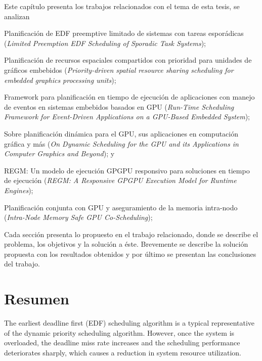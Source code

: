 Este capítulo presenta los trabajos relacionados con el tema de esta tesis, se analizan 
\begin{inparaenum}
	\item Planificación de EDF preemptive limitado de sistemas con tareas esporádicas
	 (\textit{Limited Preemption EDF Scheduling of Sporadic Task Systems});
	 \item Planificación de recursos espaciales compartidos con prioridad para unidades de gráficos embebidos 
	 (\textit{Priority-driven spatial resource sharing scheduling for embedded graphics processing units});
	\item Framework para planificación en tiempo de ejecución de aplicaciones con manejo de eventos en sistemas embebidos basados en GPU 
	(\textit{Run-Time Scheduling Framework for Event-Driven Applications on a GPU-Based Embedded System});
	\item Sobre planificación dinámica para el GPU, sus aplicaciones en computación gráfica y más
	(\textit{On Dynamic Scheduling for the GPU and its Applications in Computer Graphics and Beyond}); y
	\item REGM: Un modelo de ejecución GPGPU responsivo para soluciones en tiempo de ejecución
	(\textit{REGM: A Responsive GPGPU Execution Model for Runtime Engines});
    	\item Planificación conjunta con GPU y aseguramiento de la memoria intra-nodo 
	(\textit{Intra-Node Memory Safe GPU Co-Scheduling});
 \end{inparaenum}

\vspace{0.3cm}
Cada sección presenta lo propuesto en el trabajo relacionado, donde se describe el problema, los objetivos y la solución a éste. Brevemente se describe la solución propuesta con los resultados obtenidos y por último se presentan las conclusiones del trabajo.


\section{Resumen}

The earliest deadline first (EDF) scheduling algorithm is a typical representative of the dynamic priority scheduling algorithm. However, once the system is overloaded, the deadline miss rate increases and the scheduling performance deteriorates sharply, which causes a reduction in system resource utilization.

